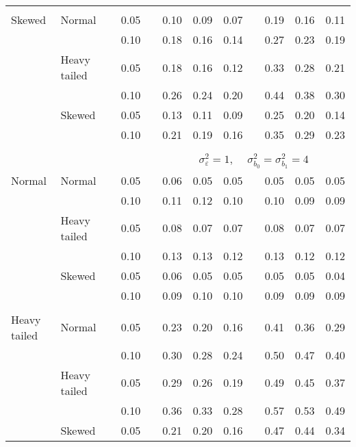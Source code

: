 \begin{table}[ht]
\begin{scriptsize}
\begin{center}
\begin{tabular}{ll p{.1cm} c p{.1cm} rrr p{.1cm} rrr}
             &&&&&&&&&&&\\
Skewed       & Normal       && 0.05 &&  0.10 & 0.09 & 0.07 && 0.19 & 0.16 & 0.11 \\ 
             &              && 0.10 &&  0.18 & 0.16 & 0.14 && 0.27 & 0.23 & 0.19 \\ 
             & Heavy tailed && 0.05 &&  0.18 & 0.16 & 0.12 && 0.33 & 0.28 & 0.21 \\ 
             &              && 0.10 &&  0.26 & 0.24 & 0.20 && 0.44 & 0.38 & 0.30 \\ 
             & Skewed       && 0.05 &&  0.13 & 0.11 & 0.09 && 0.25 & 0.20 & 0.14 \\ 
             &              && 0.10 &&  0.21 & 0.19 & 0.16 && 0.35 & 0.29 & 0.23 \\ 


&&&&&&&&&&&\\
& && && \multicolumn{7}{c}{$\sigma_{\varepsilon}^2 = 1$, \ \ $\sigma_{b_0}^2 = \sigma_{b_1}^2 = 4$} \\ \cline{6-12}
\rowcolor{gray!20}Normal       & Normal       && 0.05 &&  0.06 & 0.05 & 0.05 && 0.05 & 0.05 & 0.05 \\ 
\rowcolor{gray!20}             &              && 0.10 &&  0.11 & 0.12 & 0.10 && 0.10 & 0.09 & 0.09 \\ 
\rowcolor{gray!20}             & Heavy tailed && 0.05 &&  0.08 & 0.07 & 0.07 && 0.08 & 0.07 & 0.07 \\ 
\rowcolor{gray!20}             &              && 0.10 &&  0.13 & 0.13 & 0.12 && 0.13 & 0.12 & 0.12 \\ 
\rowcolor{gray!20}             & Skewed       && 0.05 &&  0.06 & 0.05 & 0.05 && 0.05 & 0.05 & 0.04 \\ 
\rowcolor{gray!20}             &              && 0.10 &&  0.09 & 0.10 & 0.10 && 0.09 & 0.09 & 0.09 \\
             &&&&&&&&&&&\\ 
Heavy tailed & Normal       && 0.05 &&  0.23 & 0.20 & 0.16 && 0.41 & 0.36 & 0.29 \\ 
             &              && 0.10 &&  0.30 & 0.28 & 0.24 && 0.50 & 0.47 & 0.40 \\ 
             & Heavy tailed && 0.05 &&  0.29 & 0.26 & 0.19 && 0.49 & 0.45 & 0.37 \\ 
             &              && 0.10 &&  0.36 & 0.33 & 0.28 && 0.57 & 0.53 & 0.49 \\ 
             & Skewed       && 0.05 &&  0.21 & 0.20 & 0.16 && 0.47 & 0.44 & 0.34 \\ 

\end{tabular}
\end{center}
\end{scriptsize}
\end{table}
